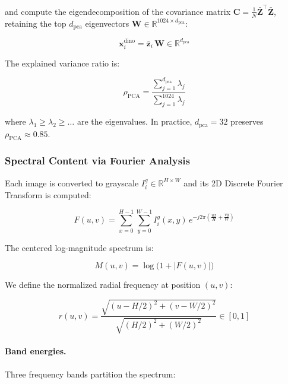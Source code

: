 and compute the eigendecomposition of the covariance matrix
$\mathbf{C} = \frac{1}{N}\bar{\mathbf{Z}}^{\top}\bar{\mathbf{Z}}$, retaining
the top $d_{\text{pca}}$ eigenvectors $\mathbf{W} \in \mathbb{R}^{1024 \times d_{\text{pca}}}$:

\begin{equation}
    \mathbf{x}_i^{\text{dino}} = \bar{\mathbf{z}}_i \, \mathbf{W}
    \in \mathbb{R}^{d_{\text{pca}}}
\end{equation}

The explained variance ratio is:

\begin{equation}
    \rho_{\text{PCA}} = \frac{\sum_{j=1}^{d_{\text{pca}}} \lambda_j}
                             {\sum_{j=1}^{1024} \lambda_j}
\end{equation}

where $\lambda_1 \geq \lambda_2 \geq \dots$ are the eigenvalues.  In practice,
$d_{\text{pca}} = 32$ preserves $\rho_{\text{PCA}} \approx 0.85$.

\subsubsection{Spectral Content via Fourier Analysis}
\label{sec:fourier}

Each image is converted to grayscale $I_i^{g} \in \mathbb{R}^{H \times W}$
and its 2D Discrete Fourier Transform is computed:

\begin{equation}
    F(u,v) = \sum_{x=0}^{H-1} \sum_{y=0}^{W-1}
             I_i^{g}(x,y)\, e^{-j2\pi\!\left(\frac{ux}{H}+\frac{vy}{W}\right)}
\end{equation}

The centered log-magnitude spectrum is:

\begin{equation}
    M(u,v) = \log\!\bigl(1 + |F(u,v)|\bigr)
\end{equation}

We define the normalized radial frequency at position $(u,v)$:

\begin{equation}
    r(u,v) = \frac{\sqrt{(u - H/2)^2 + (v - W/2)^2}}
                  {\sqrt{(H/2)^2 + (W/2)^2}}
    \in [0, 1]
\end{equation}

\paragraph{Band energies.}
Three frequency bands partition the spectrum:

